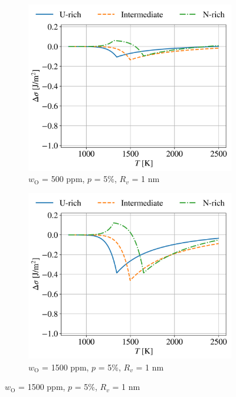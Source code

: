 \documentclass[preprint,12pt,sort&compress]{elsarticle}
\newcommand{\?}{\stackrel{?}{=}}
\begin{document}
\begin{figure}[h!]
\centering
\begin{subfigure}{0.48\textwidth}
    \includegraphics[width=\textwidth]{Delta_sigma_5_500_1e-09.png}
    \caption{$w_\text{O}$ = 500 ppm, $p$ = 5\%, $R_v$ = 1 nm}
    \label{Fig:500_0.05_1}
\end{subfigure}
\hfill
\begin{subfigure}{0.48\textwidth}
    \includegraphics[width=\textwidth]{Delta_sigma_5_1500_1e-09.png}
    \caption{$w_\text{O}$ = 1500 ppm, $p$ = 5\%, $R_v$ = 1 nm}
    \label{Fig:1500_0.05_1}

\end{subfigure}
\end{figure}
\end{document}
